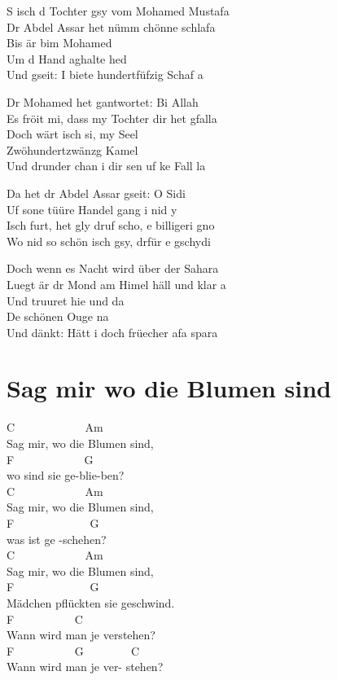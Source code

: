 \documentclass[
  letterpaper,
  twoside=false]{scrbook}
\begin{document}
S isch d Tochter gsy vom Mohamed Mustafa\\
Dr Abdel Assar het nümm chönne schlafa\\
Bis är bim Mohamed\\
Um d Hand aghalte hed\\
Und gseit: I biete hundertfüfzig Schaf a

Dr Mohamed het gantwortet: Bi Allah\\
Es fröit mi, dass my Tochter dir het gfalla\\
Doch wärt isch si, my Seel\\
Zwöhundertzwänzg Kamel\\
Und drunder chan i dir sen uf ke Fall la

Da het dr Abdel Assar gseit: O Sidi\\
Uf sone tüüre Handel gang i nid y\\
Isch furt, het gly druf scho, e billigeri gno\\
Wo nid so schön isch gsy, drfür e gschydi

Doch wenn es Nacht wird über der Sahara\\
Luegt är dr Mond am Himel häll und klar a\\
Und truuret hie und da\\
De schönen Ouge na\\
Und dänkt: Hätt i doch früecher afa spara

\hypertarget{sag-mir-wo-die-blumen-sind}{%
\chapter{Sag mir wo die Blumen sind}\label{sag-mir-wo-die-blumen-sind}}

C ~ ~ ~ ~ ~ ~ ~ Am ~ ~ ~ ~ ~\\
Sag mir, wo die Blumen sind,\\
F ~ ~ ~ ~ ~ ~ ~ G\\
wo sind sie ge-blie-ben?\\
C ~ ~ ~ ~ ~ ~ ~ Am ~ ~ ~ ~ ~\\
Sag mir, wo die Blumen sind,\\
F ~ ~ ~ ~ ~ ~ ~ ~G\\
was ist ge -schehen?\\
C ~ ~ ~ ~ ~ ~ ~ Am ~ ~ ~ ~ ~\\
Sag mir, wo die Blumen sind,\\
F ~ ~ ~ ~ ~ ~ ~ ~G\\
Mädchen pflückten sie geschwind.\\
F ~ ~ ~ ~ ~ ~ C ~ ~ ~ ~ ~ ~ ~ ~\\
Wann wird man je verstehen? ~ ~\\
F ~ ~ ~ ~ ~ ~ G ~ ~ ~ ~ ~C\\
Wann wird man je ver- stehen?
\end{document}
